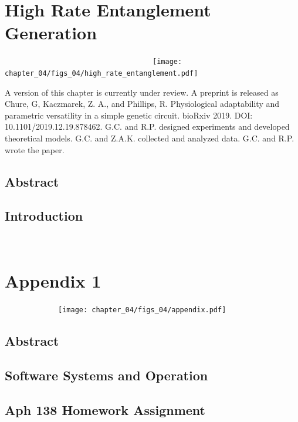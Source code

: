 \documentclass[12pt]{caltech_thesis}
\begin{document}
\hypertarget{high-rate-entanglement-generation}{%
\chapter{High Rate Entanglement
Generation}\label{high-rate-entanglement-generation}}

~~~~~~~~~~~~~~~~~~~~~~~~~~~~~~~~~~~~\texttt{[image: chapter\_04/figs\_04/high\_rate\_entanglement.pdf]}

A version of this chapter is currently under review. A preprint is
released as Chure, G, Kaczmarek, Z. A., and Phillips, R. Physiological
adaptability and parametric versatility in a simple genetic circuit.
bioRxiv 2019. DOI: 10.1101/2019.12.19.878462. G.C. and R.P. designed
experiments and developed theoretical models. G.C. and Z.A.K. collected
and analyzed data. G.C. and R.P. wrote the paper.

\hypertarget{abstract-3}{%
\section{Abstract}\label{abstract-3}}

\hypertarget{introduction-3}{%
\section{Introduction}\label{introduction-3}}

~~~~~

\hypertarget{appendix-1}{%
\chapter{Appendix 1}\label{appendix-1}}

~~~~~~~~~~~~~\texttt{[image: chapter\_04/figs\_04/appendix.pdf]}

\hypertarget{abstract-4}{%
\section{Abstract}\label{abstract-4}}

\hypertarget{software-systems-and-operation}{%
\section{Software Systems and
Operation}\label{software-systems-and-operation}}

\hypertarget{aph-138-homework-assignment}{%
\section{Aph 138 Homework
Assignment}\label{aph-138-homework-assignment}}
\end{document}
